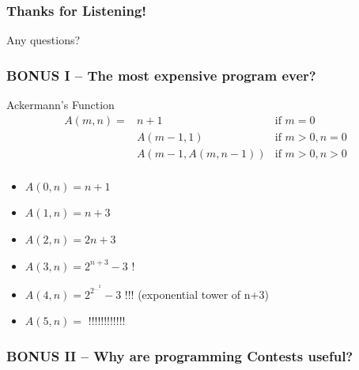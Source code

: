 \documentclass{beamer}
\begin{document}
\begin{frame} 
  \frametitle{Thanks for Listening!}
  \begin{center}
    Any questions?
  \end{center}
\end{frame}

\begin{frame}
  \frametitle{BONUS I -- The most expensive program ever?}

  \begin{block}{Ackermann's Function}
    \begin{eqnarray*}
      A(m,n) = & n+1 & \text{if } m = 0\\
      & A(m-1,1) & \text{if } m > 0, n = 0\\
      & A(m-1,A(m,n-1)) & \text{if } m > 0, n > 0\\
    \end{eqnarray*}
  \end{block}
  
  \begin{itemize}
    \item $A(0,n) = n+1$
    \item $A(1,n) = n+3$
    \item $A(2,n) = 2n+3$
    \item $A(3,n) = 2^{n+3}-3$ \alert{!}
    \item $A(4,n) = 2^{2^{...^2}}-3$ \alert{!!!} (exponential tower of n+3)
    \item $A(5,n) = $ \alert{!!!!!!!!!!!!}
  \end{itemize}
\end{frame}

\begin{frame}
  \frametitle{BONUS II -- Why are programming Contests useful?}
\end{frame}
\end{document}
